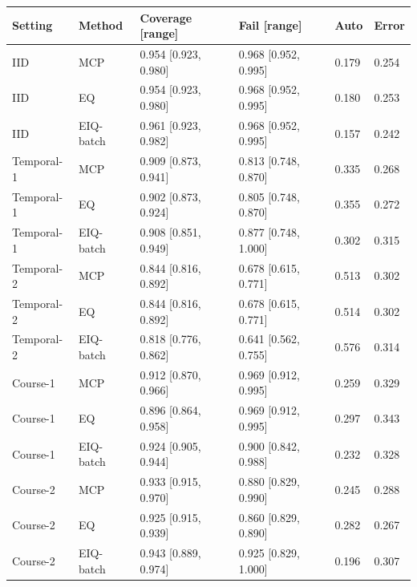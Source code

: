 \begin{tabular}{llllll}
\toprule
Setting & Method & Coverage [range] & Fail [range] & Auto & Error\\
\midrule
IID & MCP & 0.954 [0.923, 0.980] & 0.968 [0.952, 0.995] & 0.179 & 0.254\\
IID & EQ & 0.954 [0.923, 0.980] & 0.968 [0.952, 0.995] & 0.180 & 0.253\\
IID & EIQ-batch & 0.961 [0.923, 0.982] & 0.968 [0.952, 0.995] & 0.157 & 0.242\\
Temporal-1 & MCP & 0.909 [0.873, 0.941] & 0.813 [0.748, 0.870] & 0.335 & 0.268\\
Temporal-1 & EQ & 0.902 [0.873, 0.924] & 0.805 [0.748, 0.870] & 0.355 & 0.272\\
Temporal-1 & EIQ-batch & 0.908 [0.851, 0.949] & 0.877 [0.748, 1.000] & 0.302 & 0.315\\
Temporal-2 & MCP & 0.844 [0.816, 0.892] & 0.678 [0.615, 0.771] & 0.513 & 0.302\\
Temporal-2 & EQ & 0.844 [0.816, 0.892] & 0.678 [0.615, 0.771] & 0.514 & 0.302\\
Temporal-2 & EIQ-batch & 0.818 [0.776, 0.862] & 0.641 [0.562, 0.755] & 0.576 & 0.314\\
Course-1 & MCP & 0.912 [0.870, 0.966] & 0.969 [0.912, 0.995] & 0.259 & 0.329\\
Course-1 & EQ & 0.896 [0.864, 0.958] & 0.969 [0.912, 0.995] & 0.297 & 0.343\\
Course-1 & EIQ-batch & 0.924 [0.905, 0.944] & 0.900 [0.842, 0.988] & 0.232 & 0.328\\
Course-2 & MCP & 0.933 [0.915, 0.970] & 0.880 [0.829, 0.990] & 0.245 & 0.288\\
Course-2 & EQ & 0.925 [0.915, 0.939] & 0.860 [0.829, 0.890] & 0.282 & 0.267\\
Course-2 & EIQ-batch & 0.943 [0.889, 0.974] & 0.925 [0.829, 1.000] & 0.196 & 0.307\\
\bottomrule
\end{tabular}